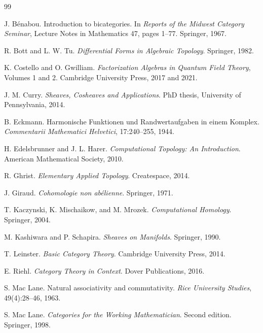 \documentclass[11pt]{article}
\begin{document}
\begin{thebibliography}{99}

J. B\'enabou.
\newblock Introduction to bicategories.
\newblock In \emph{Reports of the Midwest Category Seminar}, Lecture Notes in Mathematics 47, pages 1--77. Springer, 1967.

R. Bott and L. W. Tu.
\newblock \emph{Differential Forms in Algebraic Topology}.
\newblock Springer, 1982.

K. Costello and O. Gwilliam.
\newblock \emph{Factorization Algebras in Quantum Field Theory}, Volumes 1 and 2.
\newblock Cambridge University Press, 2017 and 2021.

J. M. Curry.
\newblock \emph{Sheaves, Cosheaves and Applications}.
\newblock PhD thesis, University of Pennsylvania, 2014.

B. Eckmann.
\newblock Harmonische Funktionen und Randwertaufgaben in einem Komplex.
\newblock \emph{Commentarii Mathematici Helvetici}, 17:240--255, 1944.

H. Edelsbrunner and J. L. Harer.
\newblock \emph{Computational Topology: An Introduction}.
\newblock American Mathematical Society, 2010.

R. Ghrist.
\newblock \emph{Elementary Applied Topology}.
\newblock Createspace, 2014.

J. Giraud.
\newblock \emph{Cohomologie non ab\'elienne}.
\newblock Springer, 1971.

T. Kaczynski, K. Mischaikow, and M. Mrozek.
\newblock \emph{Computational Homology}.
\newblock Springer, 2004.

M. Kashiwara and P. Schapira.
\newblock \emph{Sheaves on Manifolds}.
\newblock Springer, 1990.


T. Leinster.
\newblock \emph{Basic Category Theory}.
\newblock Cambridge University Press, 2014.

E. Riehl.
\newblock \emph{Category Theory in Context}.
\newblock Dover Publications, 2016.

S. Mac Lane.
\newblock Natural associativity and commutativity.
\newblock \emph{Rice University Studies}, 49(4):28--46, 1963.

S. Mac Lane.
\newblock \emph{Categories for the Working Mathematician}.
\newblock Second edition. Springer, 1998.


\end{thebibliography}
\end{document}
